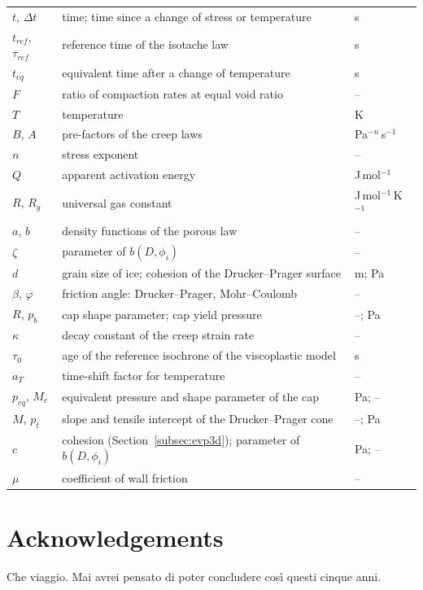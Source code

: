 \documentclass{Configuration_Files/PoliMi3i_thesis}
\begin{document}
\begin{table}[H]
\begin{tabular}{lll}
        $t$, $\Delta t$ & time; time since a change of stress or temperature & s \\[2px]
        $t_{ref}$, $\tau_{ref}$ & reference time of the isotache law & s \\[2px]
        $t_{eq}$ & equivalent time after a change of temperature & s \\[2px]
        $F$ & ratio of compaction rates at equal void ratio & -- \\[2px]
        $T$ & temperature & K \\[2px]
        $B$, $A$ & pre-factors of the creep laws & Pa$^{-n}$\,s$^{-1}$ \\[2px]
        $n$ & stress exponent & -- \\[2px]
        $Q$ & apparent activation energy & J\,mol$^{-1}$ \\[2px]
        $R$, $R_g$ & universal gas constant & J\,mol$^{-1}$\,K$^{-1}$ \\[2px]
        $a$, $b$ & density functions of the porous law & -- \\[2px]
        $\zeta$ & parameter of $b(D,\phi_i)$ & -- \\[2px]
        $d$ & grain size of ice; cohesion of the Drucker--Prager surface & m; Pa \\[2px]
        $\beta$, $\varphi$ & friction angle: Drucker--Prager, Mohr--Coulomb & -- \\[2px]
        $R$, $p_b$ & cap shape parameter; cap yield pressure & --; Pa \\[2px]
        $\kappa$ & decay constant of the creep strain rate & -- \\[2px]
        $\tau_0$ & age of the reference isochrone of the viscoplastic model & s \\[2px]
        $a_T$ & time-shift factor for temperature & -- \\[2px]
        $p_{eq}$, $M_c$ & equivalent pressure and shape parameter of the cap & Pa; -- \\[2px]
        $M$, $p_t$ & slope and tensile intercept of the Drucker--Prager cone & --; Pa \\[2px]
        $c$ & cohesion (Section~\ref{subsec:evp3d}); parameter of $b(D,\phi_i)$ & Pa; -- \\[2px]
        $\mu$ & coefficient of wall friction & -- \\[2px]
    \end{tabular}
\end{table}

\chapter*{Acknowledgements}
Che viaggio. Mai avrei pensato di poter concludere così questi cinque anni.
\end{document}
